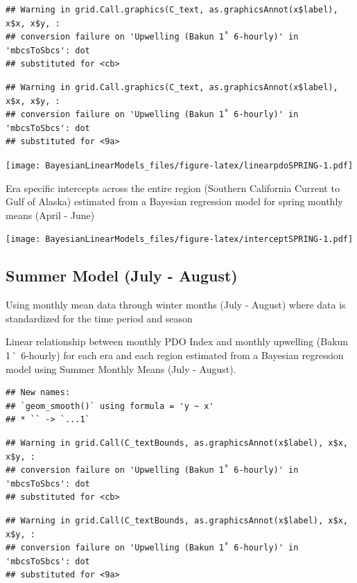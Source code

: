 \documentclass[
]{article}
\begin{document}
\begin{verbatim}
## Warning in grid.Call.graphics(C_text, as.graphicsAnnot(x$label), x$x, x$y, :
## conversion failure on 'Upwelling (Bakun 1˚ 6-hourly)' in 'mbcsToSbcs': dot
## substituted for <cb>
\end{verbatim}

\begin{verbatim}
## Warning in grid.Call.graphics(C_text, as.graphicsAnnot(x$label), x$x, x$y, :
## conversion failure on 'Upwelling (Bakun 1˚ 6-hourly)' in 'mbcsToSbcs': dot
## substituted for <9a>
\end{verbatim}

\texttt{[image: BayesianLinearModels\_files/figure-latex/linearpdoSPRING-1.pdf]}

Era specific intercepts across the entire region (Southern California
Current to Gulf of Alaska) estimated from a Bayesian regression model
for spring monthly means (April - June)

\texttt{[image: BayesianLinearModels\_files/figure-latex/interceptSPRING-1.pdf]}

\hypertarget{summer-model-july---august}{%
\subsection{Summer Model (July -
August)}\label{summer-model-july---august}}

Using monthly mean data through winter months (July - August) where data
is standardized for the time period and season

Linear relationship between monthly PDO Index and monthly upwelling
(Bakun 1˚ 6-hourly) for each era and each region estimated from a
Bayesian regression model using Summer Monthly Means (July - August).

\begin{verbatim}
## New names:
## `geom_smooth()` using formula = 'y ~ x'
## * `` -> `...1`
\end{verbatim}

\begin{verbatim}
## Warning in grid.Call(C_textBounds, as.graphicsAnnot(x$label), x$x, x$y, :
## conversion failure on 'Upwelling (Bakun 1˚ 6-hourly)' in 'mbcsToSbcs': dot
## substituted for <cb>
\end{verbatim}

\begin{verbatim}
## Warning in grid.Call(C_textBounds, as.graphicsAnnot(x$label), x$x, x$y, :
## conversion failure on 'Upwelling (Bakun 1˚ 6-hourly)' in 'mbcsToSbcs': dot
## substituted for <9a>
\end{verbatim}
\end{document}

